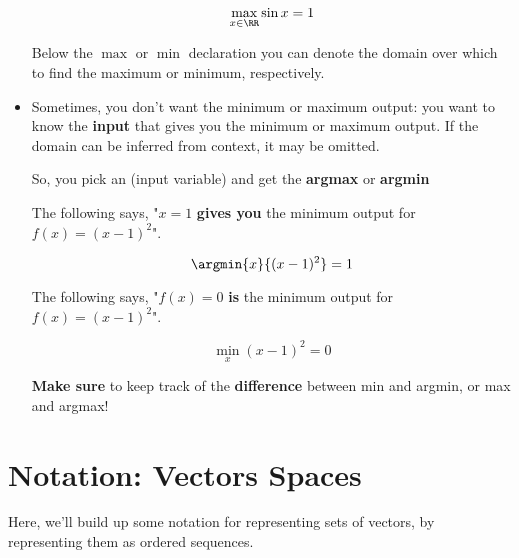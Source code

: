 \begin{itemize}
            \begin{equation}
                \max_{x \in \RR} \sin{x}  = 1
            \end{equation}
        
        Below the $\max$ or $\min$ declaration you can denote the domain over which to find the maximum or minimum, respectively.

        \item Sometimes, you don't want the minimum or maximum output: you want to know the \textbf{input} that gives you the minimum or maximum output.
        If the domain can be inferred from context, it may be omitted.

        So, you pick an  (input variable) and get the \textbf{argmax} or \textbf{argmin}
        
        The following says, "$x=1$ \textbf{gives you} the minimum output for $f(x)=(x-1)^2$".
        
            \begin{equation}
                \argmin{x}{ (x-1)^2 } = 1
            \end{equation}
            
        The following says, "$f(x)=0$ \textbf{is} the minimum output for $f(x)=(x-1)^2$".
        
            \begin{equation}
                \min_x{ (x-1)^2 } = 0
            \end{equation}
            
        \textbf{Make sure} to keep track of the \textbf{difference} between min and argmin, or max and argmax!
            
        
            
            
    
    \end{itemize}
    
\section{Notation: Vectors Spaces}

    Here, we'll build up some notation for representing sets of vectors, by representing them as ordered sequences.

